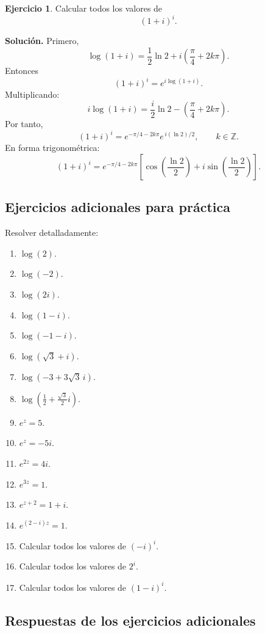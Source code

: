 \documentclass[12pt]{article}
\theoremstyle{definition}
\newtheorem{ejercicio}{Ejercicio}[section]
\theoremstyle{remark}
\begin{document}
\begin{ejercicio}
Calcular todos los valores de
\[
(1+i)^i.
\]
\end{ejercicio}

\textbf{Solución.}
Primero,
\[
\log(1+i)
=
\frac12\ln2
+i\left(\frac{\pi}{4}+2k\pi\right).
\]
Entonces
\[
(1+i)^i=e^{i\log(1+i)}.
\]
Multiplicando:
\[
i\log(1+i)
=
\frac{i}{2}\ln2
-\left(\frac{\pi}{4}+2k\pi\right).
\]
Por tanto,
\[
\boxed{
(1+i)^i
=
e^{-\pi/4-2k\pi}
e^{\,i(\ln2)/2},
\qquad k\in\mathbb Z.
}
\]
En forma trigonométrica:
\[
\boxed{
(1+i)^i
=
e^{-\pi/4-2k\pi}
\left[
\cos\left(\frac{\ln2}{2}\right)
+i\sin\left(\frac{\ln2}{2}\right)
\right].
}
\]

\subsection{Ejercicios adicionales para práctica}

Resolver detalladamente:

\begin{enumerate}
\item $\log(2)$.
\item $\log(-2)$.
\item $\log(2i)$.
\item $\log(1-i)$.
\item $\log(-1-i)$.
\item $\log(\sqrt3+i)$.
\item $\log(-3+3\sqrt3\,i)$.
\item $\log\left(\frac12+\frac{\sqrt3}{2}i\right)$.
\item $e^z=5$.
\item $e^z=-5i$.
\item $e^{2z}=4i$.
\item $e^{3z}=1$.
\item $e^{z+2}=1+i$.
\item $e^{(2-i)z}=1$.
\item Calcular todos los valores de $(-i)^i$.
\item Calcular todos los valores de $2^i$.
\item Calcular todos los valores de $(1-i)^i$.
\end{enumerate}

\subsection{Respuestas de los ejercicios adicionales}
\end{document}
